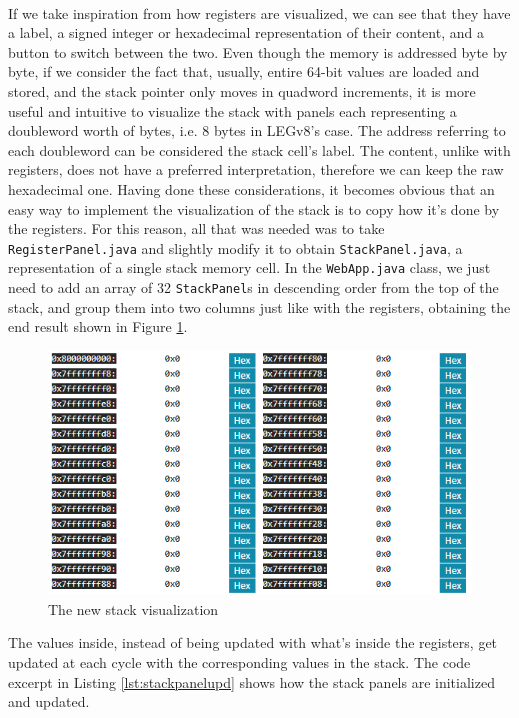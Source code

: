 \paragraph{}
If we take inspiration from how registers are visualized, we can see that they have a label, a signed integer or hexadecimal representation of their content, and a button to switch between the two. Even though the memory is addressed byte by byte, if we consider the fact that, usually, entire 64-bit values are loaded and stored, and the stack pointer only moves in quadword increments, it is more useful and intuitive to visualize the stack with panels each representing a doubleword worth of bytes, i.e. 8 bytes in LEGv8's case. The address referring to each doubleword can be considered the stack cell's label. The content, unlike with registers, does not have a preferred interpretation, therefore we can keep the raw hexadecimal one. Having done these considerations, it becomes obvious that an easy way to implement the visualization of the stack is to copy how it's done by the registers. For this reason, all that was needed was to take \verb|RegisterPanel.java| and slightly modify it to obtain \verb|StackPanel.java|, a representation of a single stack memory cell. In the \verb|WebApp.java| class, we just need to add an array of 32 \verb|StackPanel|s in descending order from the top of the stack, and group them into two columns just like with the registers, obtaining the end result shown in Figure \ref{fig:stackregs}.
\begin{figure}[H]
    \centering
    \includegraphics[width=0.85\linewidth]{img/stack_vis.png}
    \caption{The new stack visualization}
    \label{fig:stackregs}
\end{figure}
The values inside, instead of being updated with what's inside the registers, get updated at each cycle with the corresponding values in the stack. The code excerpt in Listing \ref{lst:stackpanelupd} shows how the stack panels are initialized and updated.

